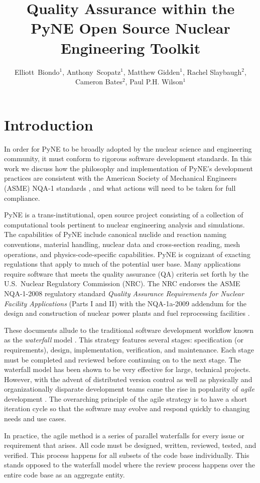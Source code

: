 \documentclass{anstrans}
\title{Quality Assurance within the PyNE Open Source Nuclear Engineering Toolkit}
\author{Elliott~Biondo$^{1}$, Anthony~Scopatz$^{1}$, Matthew Gidden$^{1}$, Rachel Slaybaugh$^{2}$, Cameron Bates$^{2}$, Paul P.H. Wilson$^{1}$}
\institute{
\and $^{1}$ The University of Wisconsin-Madison, 1415 Engineering Drive, Madison, WI 53706\\
\and $^{2}$ The University of California, Berkeley, 2521 Hearst Ave, Berkeley, CA 94709 \\
}
\begin{document}
\section{Introduction}

In order for PyNE \cite{scopatz_pyne} to be broadly adopted by the nuclear
science and engineering community, it must conform to rigorous
software development standards. In this work we discuss how the
philosophy and implementation of PyNE's development practices are consistent
with the American Society of Mechanical Engineers (ASME) NQA-1 standards
\cite{nqa}\cite{add}, and what actions will need to be taken for full
compliance.

PyNE is a trans-institutional, open source project consisting of a collection
of computational tools pertinent to nuclear engineering analysis and
simulations. The capabilities of PyNE include canonical nuclide and reaction
naming conventions, material handling, nuclear data and cross-section reading,
mesh operations, and physics-code-specific capabilities. PyNE is cognizant of
exacting regulations that apply to much of the potential user base.  Many
applications require software that meets the quality assurance (QA) criteria
set forth by the U.S.\ Nuclear Regulatory Commission (NRC). The NRC endorses
the ASME NQA-1-2008 regulatory standard \emph{Quality Assurance Requirements
for Nuclear Facility Applications} (Parts I and II) \cite{nrc} with the
NQA-1a-2009 addendum \cite{add} for the design and construction of nuclear
power plants and fuel reprocessing facilities \cite{nrc}.

These documents allude to the traditional software development workflow known as the 
\emph{waterfall} model \cite{waterfall}. This strategy features several stages:
specification (or requirements), design, implementation, verification, and maintenance. 
Each stage must be 
completed and reviewed before continuing on to the next stage. The waterfall 
model has been shown to be very effective for large, technical projects.
However, with the advent of distributed version control as well as physically 
and organizationally disparate development teams came the rise in popularity
of \emph{agile} development \cite{larman2004agile}. The overarching principle 
of the agile strategy is to have a short iteration cycle so that the software
may evolve and respond quickly to changing needs and use cases.

In practice, the agile method is a series of parallel waterfalls for every issue
or requirement that arises. All code must be designed, written, reviewed, 
tested, and verified. This process happens for all subsets of the code base
individually. This stands opposed to the waterfall model where the review 
process happens over the entire code base as an aggregate entity.
\end{document}
